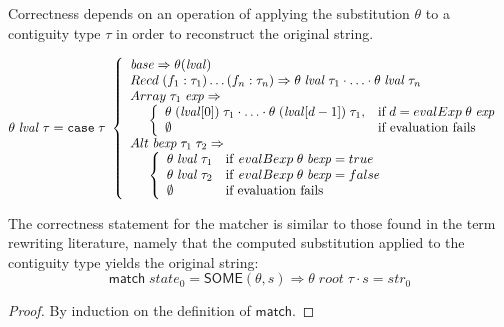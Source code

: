 \documentclass[a4paper,UKenglish,cleveref, autoref, thm-restate]{lipics-v2021}
\newcommand{\konst}[1]{\ensuremath{\mathsf{#1}}}
\newcommand{\imp}{\Rightarrow}
\newcommand{\SubstTheta}[2]{\ensuremath{\theta\;{#1}\; {#2}}}
\begin{document}
\begin{definition}

Correctness depends on an operation of applying the substitution
$\theta$ to a contiguity type $\tau$ in order to reconstruct the
original string.

\[
\SubstTheta{\mathit{lval}}{\tau} =
\mathtt{case}\; \tau\
 \left\{
 \begin{array}{l}
 \mathit{base} \Rightarrow \theta(\mathit{lval})
\\
 \konst{Recd}\; (f_1 : \tau_1) \ldots (f_n : \tau_n) \Rightarrow
   \SubstTheta{\mathit{lval}}{\tau_1} \cdot \ldots \cdot \SubstTheta{\mathit{lval}}{\tau_n}
\\
 \konst{Array}\; \tau_1 \; \mathit{exp} \Rightarrow \\
  \hspace*{5mm}
 \left\{
 \begin{array}{ll}
  \SubstTheta{(\mathit{lval}[0])}{\tau_1} \cdot \ldots \cdot
  \SubstTheta{(\mathit{lval}[d-1])}{\tau_1}, &
   \text{if}\; d = \konst{evalExp}\;\theta\;\mathit{exp} \\
    \emptyset & \text{if evaluation fails}
 \end{array}
 \right.
 \\
 \konst{Alt}\; \mathit{bexp}\;\tau_1\; \tau_2 \Rightarrow \\
  \hspace*{5mm}
 \left\{
 \begin{array}{ll}
    \SubstTheta{\mathit{lval}}{\tau_1} & \mathrm{if}\ \konst{evalBexp}\;\theta\;\mathit{bexp} = \konst{true} \\
    \SubstTheta{\mathit{lval}}{\tau_2} & \mathrm{if}\ \konst{evalBexp}\;\theta\;\mathit{bexp} = \konst{false} \\
    \emptyset          & \text{if evaluation fails}
 \end{array}
 \right.
 \\
\end{array}
 \right.
\]

\end{definition}

\begin{theorem}
The correctness statement for the matcher is similar to those found in
the term rewriting literature, namely that the computed substitution
applied to the contiguity type yields the original string:
%
\[
  \konst{match}\;\mathit{state}_0 = \konst{SOME}(\theta, s)
  \imp \theta\;\mathit{root}\;\tau \cdot s = \mathit{str}_0
\]
%
\begin{proof}
By induction on the definition of \konst{match}.
\end{proof}
\end{theorem}
\end{document}
